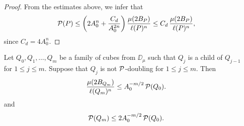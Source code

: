 \begin{proof}
	From the estimates above, we infer that
	$${\mathcal P}(P) \leq \bigg(2A_0^n + \frac{C_d}{A_0^{2n}}\bigg) \,\frac{\mu(2B_P)}{\ell(P)^n} \leq C_d\,\frac{\mu(2B_P)}{\ell(P)^n},$$
	since $C_d= 4A_0^n$.
\end{proof}
\vv


\begin{lemma}\label{lemdobpp}
	Let $Q_0,Q_1,\ldots,Q_m$ be a family of cubes from $\DD_\mu$ such that $Q_j$ is a child of $Q_{j-1}$ for $1\leq j\leq 
	m$. Suppose that $Q_j$ is not ${\mathcal P}$-doubling for $1\leq j\leq m$.
	Then
	\begin{equation}\label{eqcad35}
		\frac{\mu(2B_{Q_m})}{\ell(Q_m)^n}\leq A_0^{-m/2}\,{\mathcal P}(Q_0).
	\end{equation}
	and
	\begin{equation}\label{eqcad35'}
		{\mathcal P}(Q_m)\leq 2A_0^{-m/2}\,{\mathcal P}(Q_0).
	\end{equation}
	
\end{lemma}


